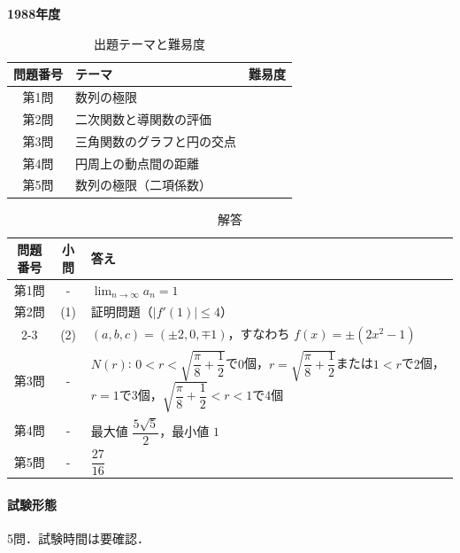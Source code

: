 \documentclass[../../main.tex]{subfiles}
\begin{document}
\begin{center}
  {\fontsize{48pt}{58pt}\selectfont \textbf{1988}\normalsize\textbf{年度}}
\end{center}

\begin{table}[htb]
  \centering
  \caption{出題テーマと難易度}
  \begin{tabular}{|c|p{9cm}|c|}
    \hline
    \textbf{問題番号} & \textbf{テーマ} & \textbf{難易度} \\
    \hline
    第1問 & 数列の極限 & \\
    \hline
    第2問 & 二次関数と導関数の評価 & \\
    \hline
    第3問 & 三角関数のグラフと円の交点 & \\
    \hline
    第4問 & 円周上の動点間の距離 & \\
    \hline
    第5問 & 数列の極限（二項係数） & \\
    \hline
  \end{tabular}
\end{table}

\begin{table}[htb]
  \centering
  \caption{解答}
  \renewcommand{\arraystretch}{1.4}
  \begin{tabular}{|c|c|p{9cm}|}
    \hline
    \textbf{問題番号} & \textbf{小問} & \textbf{答え} \\
    \hline
    第1問 & - & $\displaystyle\lim_{n\to\infty}a_n=1$ \\
    \hline
    第2問 & (1) & 証明問題（$|f'(1)|\le4$） \\
    \cline{2-3}
    & (2) & $(a,b,c)=(\pm2,0,\mp1)$，すなわち $f(x)=\pm(2x^2-1)$ \\
    \hline
    第3問 & - & $N(r)$: $0<r<\sqrt{\dfrac{\pi}{8}+\dfrac{1}{2}}$で$0$個，$r=\sqrt{\dfrac{\pi}{8}+\dfrac{1}{2}}$または$1<r$で$2$個，$r=1$で$3$個，$\sqrt{\dfrac{\pi}{8}+\dfrac{1}{2}}<r<1$で$4$個 \\
    \hline
    第4問 & - & 最大値 $\dfrac{5\sqrt{5}}{2}$，最小値 $1$ \\
    \hline
    第5問 & - & $\dfrac{27}{16}$ \\
    \hline
  \end{tabular}
\end{table}

\paragraph{試験形態}
5問．試験時間は要確認．
\end{document}
